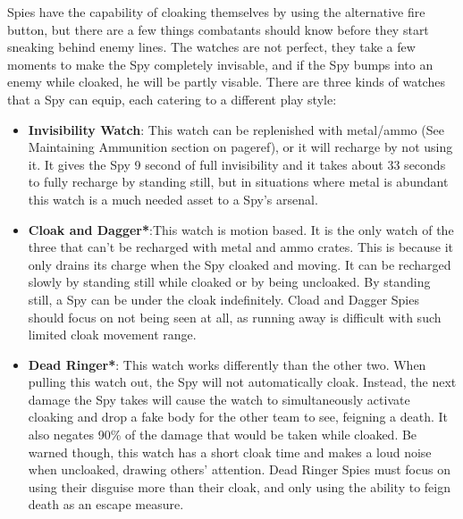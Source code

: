  Spies have the capability of cloaking themselves by using the alternative fire button, but there are a few things combatants should know before they start sneaking behind enemy lines. The watches are not perfect, they take a few moments to make the Spy completely invisable, and if the Spy bumps into an enemy while cloaked, he will be partly visable. There are three kinds of watches that a Spy can equip, each catering to a different play style:
\begin {itemize}
\item {\bf Invisibility Watch}: This watch can be replenished with metal/ammo (See Maintaining Ammunition section on {{pageref}}), or it will recharge by not using it. It gives the Spy 9 second of full invisibility and it takes about 33 seconds to fully recharge by standing still, but in situations where metal is abundant this watch is a much needed asset to a Spy's arsenal.
\item {\bf Cloak and Dagger*}:This watch is motion based. It is the only watch of the three that can't be recharged with metal and ammo crates. This is because it only drains its charge when the Spy cloaked and moving. It can be recharged slowly by standing still while cloaked or by being uncloaked. By standing still, a Spy can be under the cloak indefinitely. Cload and Dagger Spies should focus on not being seen at all, as running away is difficult with such limited cloak movement range.
\item {\bf Dead Ringer*}: This watch works differently than the other two. When pulling this watch out, the Spy will not automatically cloak. Instead, the next damage the Spy takes will cause the watch to simultaneously activate cloaking and drop a fake body for the other team to see, feigning a death. It also negates 90\% of the damage that would be taken while cloaked. Be warned though, this watch has a short cloak time and makes a loud noise when uncloaked, drawing others' attention. Dead Ringer Spies must focus on using their disguise more than their cloak, and only using the ability to feign death as an escape measure.
\end {itemize}
